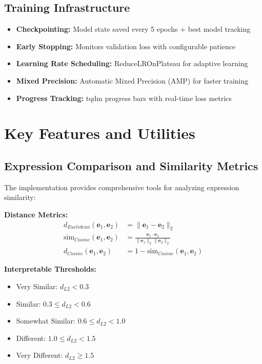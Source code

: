 \documentclass[10pt,twocolumn]{article}
\begin{document}
\subsection{Training Infrastructure}
\begin{itemize}
    \item \textbf{Checkpointing:} Model state saved every 5 epochs + best model tracking
    \item \textbf{Early Stopping:} Monitors validation loss with configurable patience
    \item \textbf{Learning Rate Scheduling:} ReduceLROnPlateau for adaptive learning
    \item \textbf{Mixed Precision:} Automatic Mixed Precision (AMP) for faster training
    \item \textbf{Progress Tracking:} tqdm progress bars with real-time loss metrics
\end{itemize}

\section{Key Features and Utilities}

\subsection{Expression Comparison and Similarity Metrics}
The implementation provides comprehensive tools for analyzing expression similarity:

\textbf{Distance Metrics:}
\begin{align}
d_{Euclidean}(\mathbf{e}_1, \mathbf{e}_2) &= \|\mathbf{e}_1 - \mathbf{e}_2\|_2 \\
\text{sim}_{Cosine}(\mathbf{e}_1, \mathbf{e}_2) &= \frac{\mathbf{e}_1 \cdot \mathbf{e}_2}{\|\mathbf{e}_1\|_2 \|\mathbf{e}_2\|_2} \\
d_{Cosine}(\mathbf{e}_1, \mathbf{e}_2) &= 1 - \text{sim}_{Cosine}(\mathbf{e}_1, \mathbf{e}_2)
\end{align}

\textbf{Interpretable Thresholds:}
\begin{itemize}
    \item Very Similar: $d_{L2} < 0.3$
    \item Similar: $0.3 \leq d_{L2} < 0.6$
    \item Somewhat Similar: $0.6 \leq d_{L2} < 1.0$
    \item Different: $1.0 \leq d_{L2} < 1.5$
    \item Very Different: $d_{L2} \geq 1.5$
\end{itemize}
\end{document}
